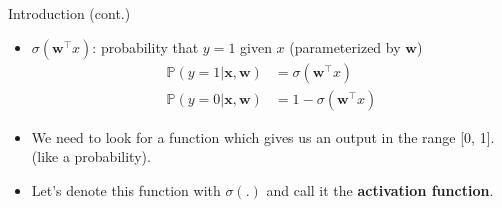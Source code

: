 \documentclass[serif, aspectratio=169]{beamer}
\begin{document}
\begin{frame}{Introduction (cont.)}
    \begin{itemize}
        \item $\sigma (\mathbf{w}^\top x)$: probability that $y=1$ given $x$ (parameterized by \textbf{$\textbf{w}$})
      \begin{align*}
        \mathbb{P}(y=1|\mathbf{x},\mathbf{w}) &= \sigma (\mathbf{w}^\top x) \\
        \mathbb{P}(y=0|\mathbf{x},\mathbf{w}) &= 1 - \sigma (\mathbf{w}^\top x)
      \end{align*}

        \item We need to look for a function which gives us an output in the range [0, 1]. (like a probability).

        \item Let's denote this function with $\sigma (.)$ and call it the \textbf{activation function}.
        
    \end{itemize}
\end{frame}
\end{document}
